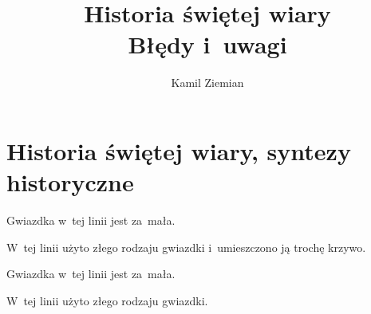 \documentclass[a4paper,11pt]{article}
\title{Historia świętej wiary \\
  {\Large Błędy i~uwagi}}
\author{Kamil Ziemian}
\begin{document}





\maketitle  %





\section{Historia świętej wiary, syntezy historyczne}

\vspace{\spaceTwo}




\vspace{0em}



\vspace{0em}


\noindent
{} Gwiazdka w~tej linii jest za~mała.

\vspace{\spaceFour}





\noindent
{} W~tej linii użyto złego rodzaju gwiazdki i~umieszczono ją
trochę krzywo.

\vspace{\spaceFour}





\noindent
{} Gwiazdka w~tej linii jest za~mała.

\vspace{\spaceFour}





\noindent
{} W~tej linii użyto złego rodzaju gwiazdki.
\end{document}
